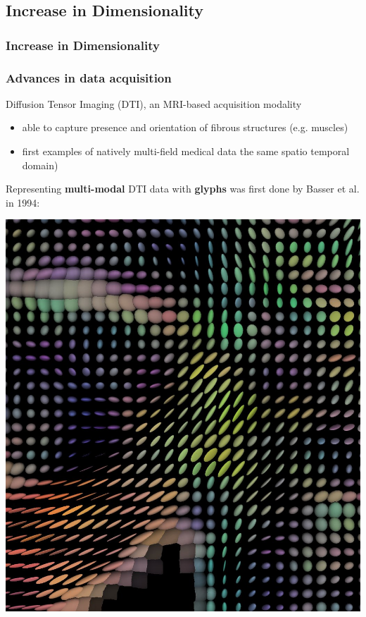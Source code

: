 \documentclass{beamer}
\begin{document}
\subsection{Increase in Dimensionality}
\begin{frame}
	\frametitle{Increase in Dimensionality}
\end{frame}



\begin{frame}
	\frametitle{Advances in data acquisition} %
	Diffusion Tensor Imaging (DTI), an MRI-based acquisition modality
	\begin{itemize}
		\item able to capture presence and orientation of fibrous structures
(e.g. muscles)
		\item first examples of natively multi-field medical data %
the same spatio temporal domain)
	\end{itemize}
	Representing \textbf{multi-modal} DTI data with \textbf{glyphs} was first
	done by Basser et al. in 1994:
	\begin{center}
		\includegraphics[width=.4\textwidth]{images/dti}
	\end{center}
\end{frame}
\end{document}
